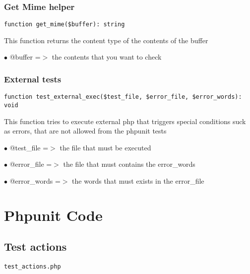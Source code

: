 \documentclass[a4paper]{article}
\begin{document}
\hypertarget{toc11}{}
\subsubsection{Get Mime helper}

\begin{lstlisting}
function get_mime($buffer): string
\end{lstlisting}

This function returns the content type of the contents of the buffer

\begin{compactitem}
\item[\color{myblue}$\bullet$] @buffer =$>$ the contents that you want to check
\end{compactitem}

\hypertarget{toc12}{}
\subsubsection{External tests}

\begin{lstlisting}
function test_external_exec($test_file, $error_file, $error_words): void
\end{lstlisting}

This function tries to execute external php that triggers special conditions
suck as errors, that are not allowed from the phpunit tests

\begin{compactitem}
\item[\color{myblue}$\bullet$] @test\_file   =$>$ the file that must be executed
\item[\color{myblue}$\bullet$] @error\_file  =$>$ the file that must contains the error\_words
\item[\color{myblue}$\bullet$] @error\_words =$>$ the words that must exists in the error\_file
\end{compactitem}


\hypertarget{toc13}{}
\section{Phpunit Code}

\hypertarget{toc14}{}
\subsection{Test actions}

\begin{lstlisting}
test_actions.php
\end{lstlisting}
\end{document}
